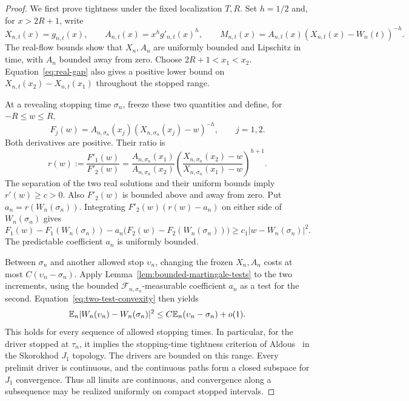 \begin{proof}
We first prove tightness under the fixed localization $T,R$.
Set $h=1/2$ and, for $x>2R+1$, write
\[
 X_{n,t}(x)=g_{n,t}(x),\qquad
 A_{n,t}(x)=x^h g'_{n,t}(x)^h,\qquad
 M_{n,t}(x)=A_{n,t}(x)(X_{n,t}(x)-W_n(t))^{-h}.
\]
The real-flow bounds show that $X_n,A_n$ are uniformly bounded
and Lipschitz in time, with $A_n$ bounded away from zero.
Choose $2R+1<x_1<x_2$.  Equation~\eqref{eq:real-gap} also gives
a positive lower bound on
$X_{n,t}(x_2)-X_{n,t}(x_1)$ throughout the stopped range.

At a revealing stopping time $\sigma_n$, freeze these two
quantities and define, for $-R\le w\le R$,
\[
 F_j(w)=A_{n,\sigma_n}(x_j)
       (X_{n,\sigma_n}(x_j)-w)^{-h},\qquad j=1,2.
\]
Both derivatives are positive.  Their ratio is
\[
 r(w):=\frac{F'_1(w)}{F'_2(w)}
 =\frac{A_{n,\sigma_n}(x_1)}{A_{n,\sigma_n}(x_2)}
 \left(\frac{X_{n,\sigma_n}(x_2)-w}
            {X_{n,\sigma_n}(x_1)-w}\right)^{h+1}.
\]
The separation of the two real solutions and their uniform
bounds imply $r'(w)\ge c>0$.  Also $F'_2(w)$ is bounded above
and away from zero.  Put
$a_n=r(W_n(\sigma_n))$.  Integrating
$F'_2(w)(r(w)-a_n)$ on either side of $W_n(\sigma_n)$ gives
\begin{equation}\label{eq:two-test-convexity}
 F_1(w)-F_1(W_n(\sigma_n))
 -a_n\bigl(F_2(w)-F_2(W_n(\sigma_n))\bigr)
 \ge c_1|w-W_n(\sigma_n)|^2.
\end{equation}
The predictable coefficient $a_n$ is uniformly bounded.

Between $\sigma_n$ and another allowed stop $\upsilon_n$, changing
the frozen $X_n,A_n$ costs at most
$C(\upsilon_n-\sigma_n)$.  Apply
Lemma~\ref{lem:bounded-martingale-tests} to the two increments,
using the bounded $\mathcal F_{n,\sigma_n}$-measurable coefficient
$a_n$ as a test for the second.  Equation~\eqref{eq:two-test-convexity}
then yields
\begin{equation}\label{eq:driver-increment}
 \mathbb E_n|W_n(\upsilon_n)-W_n(\sigma_n)|^2
 \le C\mathbb E_n(\upsilon_n-\sigma_n)+o(1).
\end{equation}
This holds for every sequence of allowed stopping times.  In
particular, for the driver stopped at $\tau_n$, it implies the
stopping-time tightness criterion of Aldous~\cite{Aldous} in the
Skorokhod $J_1$ topology.
The drivers are bounded on this range.  Every prelimit driver is
continuous, and the continuous paths form a closed subspace for
$J_1$ convergence.  Thus all limits are continuous, and convergence
along a subsequence may be realized uniformly on compact stopped
intervals.


\end{proof}
